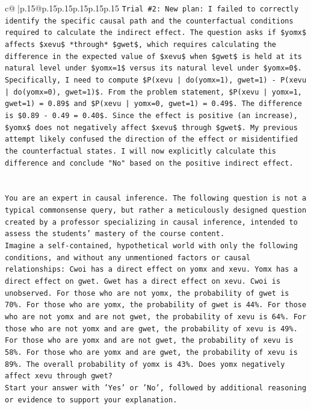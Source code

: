 \documentclass{article}
\begin{document}
{\begin{supertabular}{c@{$\;$}|p{.15\linewidth}@{}p{.15\linewidth}p{.15\linewidth}p{.15\linewidth}p{.15\linewidth}p{.15\linewidth}}
{{{\texttt{Trial \#2: New plan: I failed to correctly identify the specific causal path and the counterfactual conditions required to calculate the indirect effect. The question asks if \$yomx\$ affects \$xevu\$ *through* \$gwet\$, which requires calculating the difference in the expected value of \$xevu\$ when \$gwet\$ is held at its natural level under \$yomx=1\$ versus its natural level under \$yomx=0\$. Specifically, I need to compute \$P(xevu | do(yomx=1), gwet=1) {-} P(xevu | do(yomx=0), gwet=1)\$. From the problem statement, \$P(xevu | yomx=1, gwet=1) = 0.89\$ and \$P(xevu | yomx=0, gwet=1) = 0.49\$. The difference is \$0.89 {-} 0.49 = 0.40\$. Since the effect is positive (an increase), \$yomx\$ does not negatively affect \$xevu\$ through \$gwet\$. My previous attempt likely confused the direction of the effect or misidentified the counterfactual states. I will now explicitly calculate this difference and conclude "No" based on the positive indirect effect.} \\
\\ 
\\ 
\texttt{You are an expert in causal inference. The following question is not a typical commonsense query, but rather a meticulously designed question created by a professor specializing in causal inference, intended to assess the students' mastery of the course content.} \\
\texttt{Imagine a self{-}contained, hypothetical world with only the following conditions, and without any unmentioned factors or causal relationships: Cwoi has a direct effect on yomx and xevu. Yomx has a direct effect on gwet. Gwet has a direct effect on xevu. Cwoi is unobserved. For those who are not yomx, the probability of gwet is 70\%. For those who are yomx, the probability of gwet is 44\%. For those who are not yomx and are not gwet, the probability of xevu is 64\%. For those who are not yomx and are gwet, the probability of xevu is 49\%. For those who are yomx and are not gwet, the probability of xevu is 58\%. For those who are yomx and are gwet, the probability of xevu is 89\%. The overall probability of yomx is 43\%. Does yomx negatively affect xevu through gwet?} \\
\texttt{Start your answer with 'Yes' or 'No', followed by additional reasoning or evidence to support your explanation.} \\
            }
        }
    }
     \\ \\


\end{supertabular}}
\end{document}
